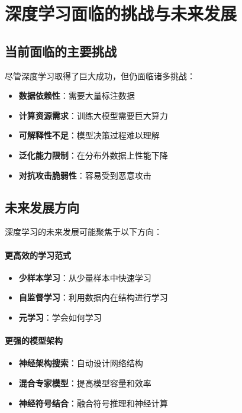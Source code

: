 \section{深度学习面临的挑战与未来发展}

\subsection{当前面临的主要挑战}

尽管深度学习取得了巨大成功，但仍面临诸多挑战：

\begin{itemize}
\item {\bf 数据依赖性}：需要大量标注数据
\item {\bf 计算资源需求}：训练大模型需要巨大算力
\item {\bf 可解释性不足}：模型决策过程难以理解
\item {\bf 泛化能力限制}：在分布外数据上性能下降
\item {\bf 对抗攻击脆弱性}：容易受到恶意攻击
\end{itemize}

\subsection{未来发展方向}

深度学习的未来发展可能聚焦于以下方向：

\paragraph{更高效的学习范式}
\begin{itemize}
\item {\bf 少样本学习}：从少量样本中快速学习
\item {\bf 自监督学习}：利用数据内在结构进行学习
\item {\bf 元学习}：学会如何学习
\end{itemize}

\paragraph{更强的模型架构}
\begin{itemize}
\item {\bf 神经架构搜索}：自动设计网络结构
\item {\bf 混合专家模型}：提高模型容量和效率
\item {\bf 神经符号结合}：融合符号推理和神经计算
\end{itemize}

